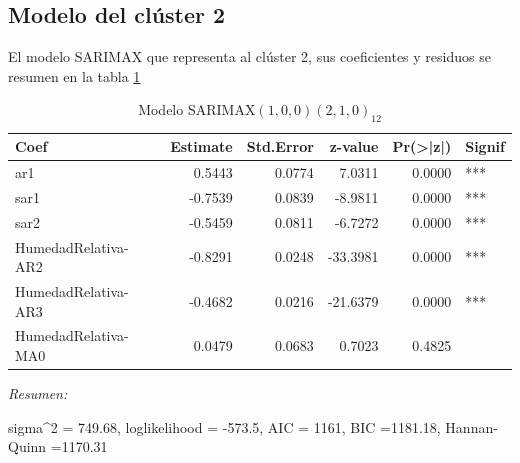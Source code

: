 \documentclass[12pt,oneside]{book}\usepackage[]{graphicx}\usepackage[]{color}
\newenvironment{knitrout}{}{} %
\theoremstyle{definition} %
\begin{document}
\subsection{Modelo del clúster 2}




El modelo SARIMAX que representa al clúster 2, sus coeficientes y residuos se resumen en la tabla \ref{tab:sarimax_cl2}

\begin{knitrout}
\color{fgcolor}\begin{table}

\caption{\label{tab:unnamed-chunk-101}\label{tab:sarimax_cl2}Modelo SARIMAX$(1,0,0)(2,1,0)_{12}$}
\centering
\begin{threeparttable}
\begin{tabular}[t]{lrrrrl}
\toprule
Coef & Estimate & Std.Error & z-value & Pr(>|z|) & Signif\\
\midrule
\rowcolor{gray!6}  ar1 & 0.5443 & 0.0774 & 7.0311 & 0.0000 & ***\\
sar1 & -0.7539 & 0.0839 & -8.9811 & 0.0000 & ***\\
\rowcolor{gray!6}  sar2 & -0.5459 & 0.0811 & -6.7272 & 0.0000 & ***\\
HumedadRelativa-AR2 & -0.8291 & 0.0248 & -33.3981 & 0.0000 & ***\\
\rowcolor{gray!6}  HumedadRelativa-AR3 & -0.4682 & 0.0216 & -21.6379 & 0.0000 & ***\\
\addlinespace
HumedadRelativa-MA0 & 0.0479 & 0.0683 & 0.7023 & 0.4825 & \\
\bottomrule
\end{tabular}
\begin{tablenotes}
\item \textit{Resumen:} 
\item sigma\textasciicircum{}2 = 749.68, loglikelihood = -573.5, AIC = 1161, BIC =1181.18, Hannan-Quinn =1170.31
\end{tablenotes}
\end{threeparttable}
\end{table}


\end{knitrout}
\end{document}
